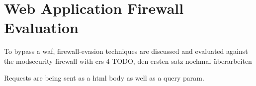 \section{Web Application Firewall Evaluation}
To bypass a waf, firewall-evasion techniques are discussed and evaluated against the modsecurity firewall with crs 4 {\color{red} TODO, den ersten satz nochmal überarbeiten}

Requests are being sent as a html body as well as a query param.
